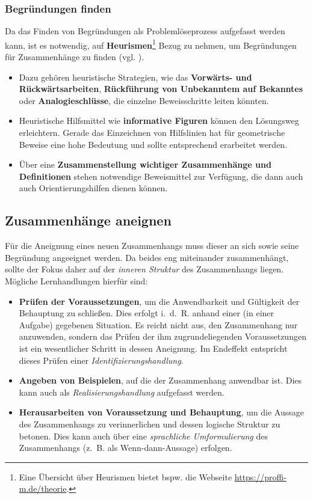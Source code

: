 \documentclass[
]{scrbook}
\providecommand{\tightlist}{%
  \setlength{\itemsep}{0pt}\setlength{\parskip}{0pt}}
\theoremstyle{definition}
\theoremstyle{definition}
\theoremstyle{definition}
\theoremstyle{definition}
\theoremstyle{remark}
\begin{document}
\subsubsection{Begründungen finden}\label{begruxfcndungen-finden}

Da das Finden von Begründungen als Problemlöseprozess aufgefasst werden kann, ist es notwendig, auf \textbf{Heurismen}\footnote{Eine Übersicht über Heurismen bietet bspw. die Webseite \url{https://proffi-m.de/theorie}.} Bezug zu nehmen, um Begründungen für Zusammenhänge zu finden (vgl. ).

\begin{itemize}
\tightlist
\item
  Dazu gehören heuristische Strategien, wie das \textbf{Vorwärts- und Rückwärtsarbeiten}, \textbf{Rückführung von Unbekanntem auf Bekanntes} oder \textbf{Analogieschlüsse}, die einzelne Beweisschritte leiten könnten.
\item
  Heuristische Hilfsmittel wie \textbf{informative Figuren} können den Lösungsweg erleichtern. Gerade das Einzeichnen von Hilfslinien hat für geometrische Beweise eine hohe Bedeutung und sollte entsprechend erarbeitet werden.
\item
  Über eine \textbf{Zusammenstellung wichtiger Zusammenhänge und Definitionen} stehen notwendige Beweismittel zur Verfügung, die dann auch auch Orientierungshilfen dienen können.
\end{itemize}

\subsection{Zusammenhänge aneignen}\label{zusammenhuxe4nge-aneignen}

Für die Aneignung eines neuen Zusammenhangs muss dieser an sich sowie seine Begründung angeeignet werden. Da beides eng miteinander zusammenhängt, sollte der Fokus daher auf der \emph{inneren Struktur} des Zusammenhangs liegen. Mögliche Lernhandlungen hierfür sind:

\begin{itemize}
\tightlist
\item
  \textbf{Prüfen der Voraussetzungen}, um die Anwendbarkeit und Gültigkeit der Behauptung zu schließen. Dies erfolgt i.~d.~R. anhand einer (in einer Aufgabe) gegebenen Situation. Es reicht nicht aus, den Zusammenhang nur anzuwenden, sondern das Prüfen der ihm zugrundeliegenden Voraussetzungen ist ein wesentlicher Schritt in dessen Aneignung. Im Endeffekt entspricht dieses Prüfen einer \emph{Identifizierungshandlung}.
\item
  \textbf{Angeben von Beispielen}, auf die der Zusammenhang anwendbar ist. Dies kann auch als \emph{Realisierungshandlung} aufgefasst werden.
\item
  \textbf{Herausarbeiten von Voraussetzung und Behauptung}, um die Aussage des Zusammenhangs zu verinnerlichen und dessen logische Struktur zu betonen. Dies kann auch über eine \emph{sprachliche Umformulierung} des Zusammenhangs (z.~B. als Wenn-dann-Aussage) erfolgen.
\end{itemize}
\end{document}
